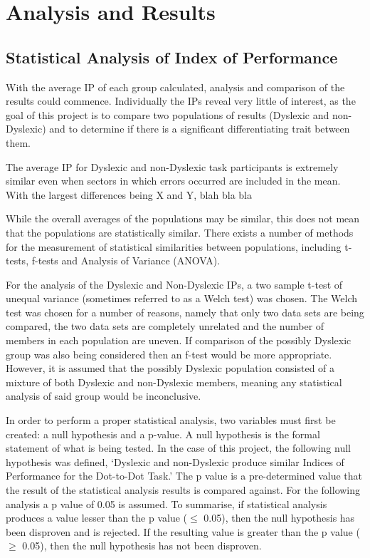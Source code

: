 \section{Analysis and Results}
	\subsection{Statistical Analysis of Index of Performance}
		With the average IP of each group calculated, analysis and comparison of the results could  commence. Individually the IPs reveal very little of interest, as the goal of this project is to compare two populations of results (Dyslexic and non-Dyslexic) and to determine if there is a significant differentiating trait between them.

		The average IP for Dyslexic and non-Dyslexic task participants is extremely similar even when sectors in which errors occurred are included in the mean. With the largest differences being X and Y, blah bla bla

		While the overall averages of the populations may be similar, this does not mean that the populations are statistically similar. There exists a number of methods for the measurement of statistical similarities between populations, including t-tests, f-tests and Analysis of Variance (ANOVA).

		For the analysis of the Dyslexic and Non-Dyslexic IPs, a two sample t-test of unequal variance (sometimes referred to as a Welch test)  was chosen. The Welch test was chosen for a number of reasons, namely that only two data sets are being compared, the two data sets are completely unrelated and the number of members in each population are uneven. If comparison of the possibly Dyslexic group was also being considered then an f-test would be more appropriate. However, it is assumed that the possibly Dyslexic population consisted of a mixture of both Dyslexic and non-Dyslexic members, meaning any statistical analysis of said group would be inconclusive.

		In order to perform a proper statistical analysis, two variables must first be created: a null hypothesis and a p-value. A null hypothesis is the formal statement of what is being tested. In the case of this project, the following null hypothesis was defined,
		‘Dyslexic and non-Dyslexic produce similar Indices of Performance for the Dot-to-Dot Task.’
		The p value is a pre-determined value that the result of the statistical analysis results is compared against. For the following analysis a p value of 0.05 is assumed. To summarise, if statistical analysis produces a value lesser than the p value ($\leq$ 0.05), then the null hypothesis has been disproven and is rejected. If the resulting value is greater than the p value ($\geq$ 0.05), then the null hypothesis has not been disproven.

